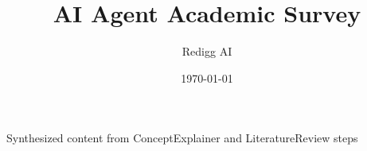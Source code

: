 \documentclass[12pt,a4paper]{article}
\title{AI Agent Academic Survey}
\author{Redigg AI}
\date{\today}
\begin{document}
\maketitle

Synthesized content from ConceptExplainer and LiteratureReview steps
\end{document}
